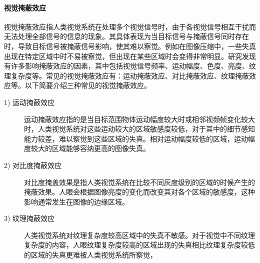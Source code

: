 

  \paragraph{视觉掩蔽效应} 视觉掩蔽效应指人类视觉系统在处理多个视觉信号时，由于各视觉信号相互干扰而无法处理全部信号的信息的现象。其具体表现为当目标信号与掩蔽信号同时存在时，导致目标信号被掩蔽信号影响，使其难以察觉。例如在图像压缩中，一些失真出现在特定区域中时不易被察觉，但出现在某些区域时会变得非常明显。研究发现有许多影响掩蔽效应的因素，其中包括视觉信号频率、运动幅度、色度、亮度、纹理复杂度等。常见的视觉掩蔽效应有：运动掩蔽效应、对比掩蔽效应、纹理掩蔽效应等。以下简要介绍三种常见的视觉掩蔽效应。
  \begin{description}
    \item [1) 运动掩蔽效应]
    运动掩蔽效应指的是当目标范围物体运动幅度较大时或相邻视频帧变化较大时，人类视觉系统对这些运动较大的区域敏感度较低，对于其中的细节感知能力较差，难以察觉到这些区域的失真。相对运动幅度较低的区域，运动幅度较大的区域能够容纳更高的图像失真。
    \item [2) 对比度掩蔽效应]
    对比度掩盖效果是指人类视觉系统在比较不同灰度级别的区域的时候产生的掩蔽效果。人眼会根据图像亮度的变化而改变其对各个区域的敏感度，这种影响通常发生在图像的边缘区域。
    \item [3) 纹理掩蔽效应]
    人类视觉系统对纹理复杂度较高区域中的失真不敏感。对于视觉中不同纹理复杂度的内容，人眼纹理复杂度较高的区域出现的失真相比纹理复杂度较低的区域的失真更难被人类视觉系统所察觉，
  \end{description}

